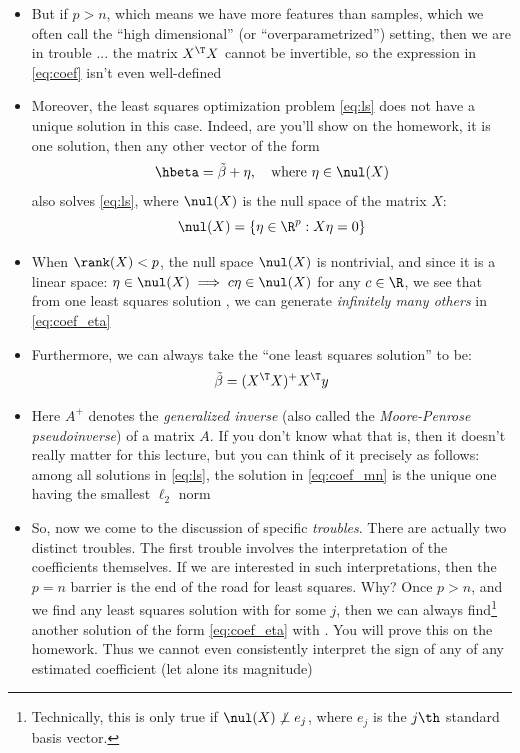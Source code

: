 \documentclass{article}
\begin{document}
\begin{itemize}
\item But if $p > n$, which means we have more features than samples, which we 
  often call the ``high dimensional'' (or ``overparametrized'') setting, then we 
  are in trouble ... the matrix $X^\T X$ cannot be invertible, so the expression
  in \eqref{eq:coef} isn't even well-defined   

\item Moreover, the least squares optimization problem \eqref{eq:ls} does not
  have a unique solution in this case. Indeed, are you'll show on the homework,
  it \smash{$\tilde\beta$} is one solution, then any other vector of the form    
  \begin{equation}
  \label{eq:coef_eta}
  \hbeta = \tilde\beta + \eta, \quad \text{where $\eta \in \nul(X)$}
  \end{equation}
  also solves \eqref{eq:ls}, where $\nul(X)$ is the null space of the matrix
  $X$:
  \[
  \nul(X) = \{ \eta \in \R^p : X \eta = 0 \} 
  \]

\item When $\rank(X) < p$, the null space $\nul(X)$ is nontrivial, and since it  
  is a linear space: $\eta \in \nul(X) \implies c \eta \in \nul(X)$ for any $c
  \in \R$, we see that from one least squares solution \smash{$\tilde\beta$}, we
  can generate \emph{infinitely many others} in \eqref{eq:coef_eta} 
  
\item Furthermore, we can always take the ``one least squares solution'' to be:  
  \begin{equation}
  \label{eq:coef_mn}
  \tilde\beta = (X^\T X)^+ X^\T y
  \end{equation}

  \item Here $A^+$ denotes the \emph{generalized inverse} (also called the 
  \emph{Moore-Penrose pseudoinverse}) of a matrix $A$. If you don't know what
  that is, then it doesn't really matter for this lecture, but you can think of
  it precisely as follows: among all solutions in \eqref{eq:ls}, the solution in
  \eqref{eq:coef_mn} is the unique one having the smallest $\ell_2$ norm 

\item So, now we come to the discussion of specific \emph{troubles}. There are
  actually two distinct troubles. The first trouble involves the interpretation
  of the coefficients themselves. If we are interested in such interpretations,
  then the $p = n$ barrier is the end of the road for least squares. Why? Once
  $p > n$, and we find any least squares solution \smash{$\tilde\beta$} with
   for some $j$, then we can always
  find\footnote{Technically, this is only true if $\nul(X) \not \perp e_j$,
    where $e_j$ is the $j\th$ standard basis vector.}  
  another solution \smash{$\hbeta$} of the form \eqref{eq:coef_eta} with
  . You will prove this on the homework. Thus we cannot
  even consistently interpret the sign of any of any estimated coefficient (let
  alone its magnitude) 


\end{itemize}
\end{document}
